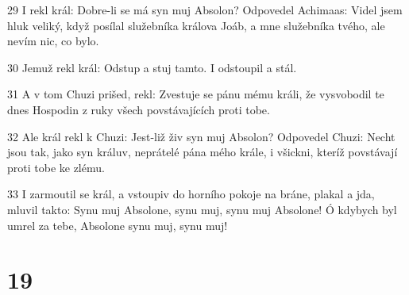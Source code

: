 \par 29 I rekl král: Dobre-li se má syn muj Absolon? Odpovedel Achimaas: Videl jsem hluk veliký, když posílal služebníka králova Joáb, a mne služebníka tvého, ale nevím nic, co bylo.
\par 30 Jemuž rekl král: Odstup a stuj tamto. I odstoupil a stál.
\par 31 A v tom Chuzi prišed, rekl: Zvestuje se pánu mému králi, že vysvobodil te dnes Hospodin z ruky všech povstávajících proti tobe.
\par 32 Ale král rekl k Chuzi: Jest-liž živ syn muj Absolon? Odpovedel Chuzi: Necht jsou tak, jako syn králuv, neprátelé pána mého krále, i všickni, kteríž povstávají proti tobe ke zlému.
\par 33 I zarmoutil se král, a vstoupiv do horního pokoje na bráne, plakal a jda, mluvil takto: Synu muj Absolone, synu muj, synu muj Absolone! Ó kdybych byl umrel za tebe, Absolone synu muj, synu muj!

\chapter{19}

